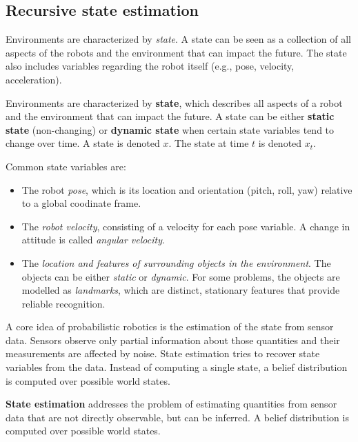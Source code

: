 \subsection{Recursive state estimation}
Environments are characterized by \textit{state}.
A state can be seen as a collection of all aspects of the robots and the environment that can impact the future.
The state also includes variables regarding the robot itself (e.g., pose, velocity, acceleration).
\begin{mydef}
Environments are characterized by \textbf{state}, which describes all aspects of a robot and the environment that can impact the future.
A state can be either \textbf{static state} (non-changing) or \textbf{dynamic state} when certain state variables tend to change over time.
A state is denoted $x$.
The state at time $t$ is denoted $x_t$.
\end{mydef}
Common state variables are:
\begin{itemize}
\item The robot \textit{pose}, which is its location and orientation (pitch, roll, yaw) relative to a global coodinate frame.
\item The \textit{robot velocity}, consisting of a velocity for each pose variable. A change in attitude is called \textit{angular velocity}.
\item The \textit{location and features of surrounding objects in the environment}. The objects can be either \textit{static} or \textit{dynamic}. For some problems, the objects are modelled as \textit{landmarks}, which are distinct, stationary features that provide reliable recognition.
\end{itemize}

A core idea of probabilistic robotics is the estimation of the state from sensor data.
Sensors observe only partial information about those quantities and their measurements are affected by noise. 
State estimation tries to recover state variables from the data.
Instead of computing a single state, a belief distribution is computed over possible world states.
\begin{mydef}
\textbf{State estimation} addresses the problem of estimating quantities from sensor data that are not directly observable, but can be inferred.
A belief distribution is computed over possible world states.
\end{mydef}

